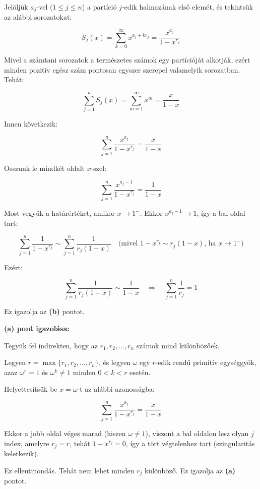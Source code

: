 \begin{solution}
Jelöljük $a_{j}$-vel ($1\leq j\leq n$) a partíció $j$-edik halmazának
első elemét, és tekintsük az alábbi sorozatokat:

\[
S_{j}(x)=\sum_{k=0}^{\infty}x^{a_{j}+kr_{j}}=\frac{x^{a_{j}}}{1-x^{r_{j}}}
\]

Mivel a számtani sorozatok a természetes számok egy partícióját alkotják,
ezért minden pozitív egész szám pontosan egyszer szerepel valamelyik
sorozatban. Tehát:

\[
\sum_{j=1}^{n}S_{j}(x)=\sum_{m=1}^{\infty}x^{m}=\frac{x}{1-x}
\]

Innen következik:

\[
\sum_{j=1}^{n}\frac{x^{a_{j}}}{1-x^{r_{j}}}=\frac{x}{1-x}
\]

Osszunk le mindkét oldalt $x$-szel:

\[
\sum_{j=1}^{n}\frac{x^{a_{j}-1}}{1-x^{r_{j}}}=\frac{1}{1-x}
\]

Most vegyük a határértéket, amikor $x\to1^{-}$. Ekkor $x^{a_{j}-1}\to1$,
így a bal oldal tart:

\[
\sum_{j=1}^{n}\frac{1}{1-x^{r_{j}}}\sim\sum_{j=1}^{n}\frac{1}{r_{j}(1-x)}\quad\text{(mivel }1-x^{r_{j}}\sim r_{j}(1-x)\text{, ha }x\to1^{-})
\]

Ezért:

\[
\sum_{j=1}^{n}\frac{1}{r_{j}(1-x)}\sim\frac{1}{1-x}\quad\Rightarrow\quad\sum_{j=1}^{n}\frac{1}{r_{j}}=1
\]

Ez igazolja az \textbf{(b)} pontot.

\bigskip{}

\textbf{(a) pont igazolása:}

Tegyük fel indirekten, hogy az $r_{1},r_{2},\dots,r_{n}$ számok mind
különbözőek.

Legyen $r=\max\{r_{1},r_{2},\dots,r_{n}\}$, és legyen $\omega$ egy
$r$-edik rendű primitív egységgyök, azaz $\omega^{r}=1$ és $\omega^{k}\neq1$
minden $0<k<r$ esetén.

Helyettesítsük be $x=\omega$-t az alábbi azonosságba:

\[
\sum_{j=1}^{n}\frac{x^{a_{j}}}{1-x^{r_{j}}}=\frac{x}{1-x}
\]

Ekkor a jobb oldal véges marad (hiszen $\omega\neq1$), viszont a
bal oldalon lesz olyan $j$ index, amelyre $r_{j}=r$, tehát $1-x^{r_{j}}=0$,
így a tört végtelenhez tart (szingularitás keletkezik).

Ez ellentmondás. Tehát nem lehet minden $r_{j}$ különböző. Ez igazolja
az \textbf{(a)} pontot.
\end{solution}
